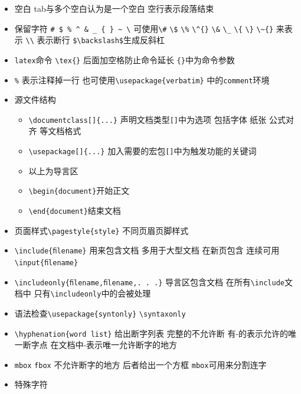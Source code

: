 \documentclass[]{book}
\begin{document}
\begin{itemize}
\item
  空白 tab与多个空白认为是一个空白 空行表示段落结束
\item
  保留字符 \texttt{\#\ \$\ \%\ \^{}\ \&\ \_\ \{\ \}\ \textasciitilde{}\ \textbackslash{}} 可使用\texttt{\textbackslash{}\#} \texttt{\textbackslash{}\$} \texttt{\textbackslash{}\%} \texttt{\textbackslash{}\^{}\{\}} \texttt{\textbackslash{}\&} \texttt{\textbackslash{}\_} \texttt{\textbackslash{}\{} \texttt{\textbackslash{}\}} \texttt{\textbackslash{}\textasciitilde{}\{\}} 来表示 \texttt{\textbackslash{}\textbackslash{}} 表示断行 \texttt{\$\textbackslash{}backslash\$}生成反斜杠
\item
  \texttt{latex}命令 \texttt{\textbackslash{}tex\{\}} 后面加空格防止命令延长 \texttt{\{\}}中为命令参数
\item
  \texttt{\%} 表示注释掉一行 也可使用\texttt{\textbackslash{}usepackage\{verbatim\}} 中的\texttt{comment}环境
\item
  源文件结构

  \begin{itemize}
  \item
    \texttt{\textbackslash{}documentclass{[}{]}\{...\}} 声明文档类型\texttt{{[}{]}}中为选项 包括字体 纸张 公式对齐 等文档格式
  \item
    \texttt{\textbackslash{}usepackage{[}{]}\{...\}} 加入需要的宏包\texttt{{[}{]}}中为触发功能的关键词
  \item
    以上为导言区
  \item
    \texttt{\textbackslash{}begin\{document\}}开始正文
  \item
    \texttt{\textbackslash{}end\{document\}}结束文档
  \end{itemize}
\item
  页面样式\texttt{\textbackslash{}pagestyle\{style\}} 不同页眉页脚样式
\item
  \texttt{\textbackslash{}include\{ﬁlename\}} 用来包含文档 多用于大型文档 在新页包含 连续可用\texttt{\textbackslash{}input\{ﬁlename\}}
\item
  \texttt{\textbackslash{}includeonly\{ﬁlename,ﬁlename,.\ .\ .\}} 导言区包含文档 在所有\texttt{\textbackslash{}include}文档中 只有\texttt{\textbackslash{}includeonly}中的会被处理
\item
  语法检查\texttt{\textbackslash{}usepackage\{syntonly\}} \texttt{\textbackslash{}syntaxonly}
\item
  \texttt{\textbackslash{}hyphenation\{word\ list\}} 给出断字列表 完整的不允许断 有-的表示允许的唯一断字点 在文档中-表示唯一允许断字的地方
\item
  \texttt{mbox} \texttt{fbox} 不允许断字的地方 后者给出一个方框 \texttt{mbox}可用来分割连字
\item
  特殊字符


\end{itemize}
\end{document}
